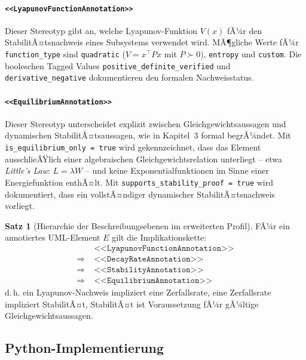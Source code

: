 ﻿\documentclass[a4paper,12pt]{report}
\theoremstyle{definition}
\newtheorem{satz}{Satz}[section]
\begin{document}
\paragraph{\texttt{<<LyapunovFunctionAnnotation>>}}

Dieser Stereotyp gibt an, welche Lyapunov-Funk\-tion $V(x)$ fÃ¼r den
StabilitÃ¤tsnachweis eines Subsystems verwendet wird. MÃ¶gliche Werte fÃ¼r
\texttt{function\_type} sind \texttt{quadratic} ($V = x^\top P x$ mit
$P \succ 0$), \texttt{entropy} und \texttt{custom}. Die booleschen Tagged
Values \texttt{positive\_definite\_verified} und
\texttt{derivative\_nega\newline tive} dokumentieren den formalen Nachweisstatus.

\paragraph{\texttt{<<EquilibriumAnnotation>>}}

Dieser Stereotyp unterscheidet explizit zwischen Gleichgewichtsaussagen und
dynamischen StabilitÃ¤tsaussagen, wie in Kapitel~3 formal begrÃ¼ndet. Mit
\texttt{is\_equilibrium\_only = true} wird gekennzeichnet, dass das Element
ausschlieÃŸlich einer algebraischen Gleichgewichtsrelation unterliegt -- etwa
\textit{Little's Law}: $L = \lambda W$ -- und keine Exponentialfunktionen
im Sinne einer Energiefunktion enthÃ¤lt. Mit
\texttt{supports\_stability\_proof = true} wird dokumentiert, dass ein
vollstÃ¤ndiger dynamischer StabilitÃ¤tsnachweis vorliegt.

\begin{satz}[Hierarchie der Beschreibungsebenen im erweiterten Profil]
	FÃ¼r ein annotiertes UML-Element $E$ gilt die Implikationskette:
	\[
	\begin{aligned}
		& \texttt{<<LyapunovFunctionAnnotation>>} \\
		\Rightarrow\; & \texttt{<<DecayRateAnnotation>>} \\
		\Rightarrow\; & \texttt{<<StabilityAnnotation>>} \\
		\Rightarrow\; & \texttt{<<EquilibriumAnnotation>>}
	\end{aligned}
	\]
	d.\,h. ein Lyapunov-Nachweis impliziert eine Zerfallsrate, eine
	Zerfallsrate impliziert StabilitÃ¤t, StabilitÃ¤t ist Voraussetzung fÃ¼r
	gÃ¼ltige Gleichgewichtsaussagen.
\end{satz}

\subsection{Python-Implementierung}
\end{document}
